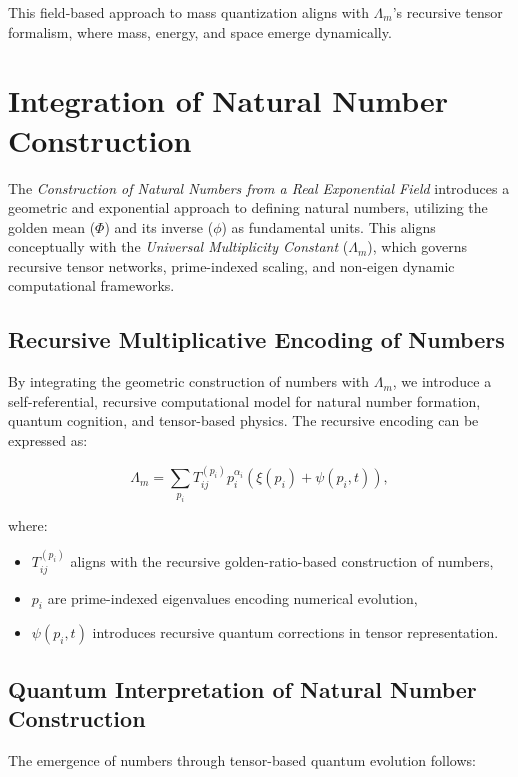 \documentclass{article}
\theoremstyle{plain}
\begin{document}
This field-based approach to mass quantization aligns with $\Lambda_m$’s recursive tensor formalism, where mass, energy, and space emerge dynamically.
\section{Integration of Natural Number Construction}

The \textit{Construction of Natural Numbers from a Real Exponential Field} introduces a geometric and exponential approach to defining natural numbers, utilizing the golden mean ($\Phi$) and its inverse ($\phi$) as fundamental units. This aligns conceptually with the \textit{Universal Multiplicity Constant} ($\Lambda_m$), which governs recursive tensor networks, prime-indexed scaling, and non-eigen dynamic computational frameworks.

\subsection{Recursive Multiplicative Encoding of Numbers}

By integrating the geometric construction of numbers with $\Lambda_m$, we introduce a self-referential, recursive computational model for natural number formation, quantum cognition, and tensor-based physics. The recursive encoding can be expressed as:

\begin{equation}
    \Lambda_m = \sum_{p_i} T_{ij}^{(p_i)} p_i^{\alpha_i} \left( \xi(p_i) + \psi(p_i, t) \right),
\end{equation}

where:
\begin{itemize}
    \item $T_{ij}^{(p_i)}$ aligns with the recursive golden-ratio-based construction of numbers,
    \item $p_i$ are prime-indexed eigenvalues encoding numerical evolution,
    \item $\psi(p_i, t)$ introduces recursive quantum corrections in tensor representation.
\end{itemize}

\subsection{Quantum Interpretation of Natural Number Construction}

The emergence of numbers through tensor-based quantum evolution follows:
\end{document}

